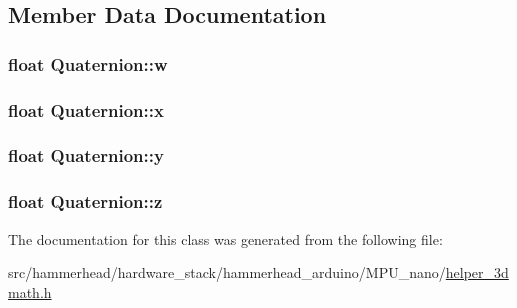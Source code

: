 \subsection{Member Data Documentation}
\subsubsection[{\texorpdfstring{w}{w}}]{\setlength{\rightskip}{0pt plus 5cm}float Quaternion\+::w}\hypertarget{classQuaternion_aa44a65ab99e36f6ab8771030eed8a7ad}{}\label{classQuaternion_aa44a65ab99e36f6ab8771030eed8a7ad}
\subsubsection[{\texorpdfstring{x}{x}}]{\setlength{\rightskip}{0pt plus 5cm}float Quaternion\+::x}\hypertarget{classQuaternion_a8b80f191a3155cc0158d2b4f4d50b2cb}{}\label{classQuaternion_a8b80f191a3155cc0158d2b4f4d50b2cb}
\subsubsection[{\texorpdfstring{y}{y}}]{\setlength{\rightskip}{0pt plus 5cm}float Quaternion\+::y}\hypertarget{classQuaternion_a3bd3f270462944423611f44e19d2511b}{}\label{classQuaternion_a3bd3f270462944423611f44e19d2511b}
\subsubsection[{\texorpdfstring{z}{z}}]{\setlength{\rightskip}{0pt plus 5cm}float Quaternion\+::z}\hypertarget{classQuaternion_a625cb732d8ff3083e7852b86b736ab29}{}\label{classQuaternion_a625cb732d8ff3083e7852b86b736ab29}


The documentation for this class was generated from the following file\+:\begin{DoxyCompactItemize}
\item 
src/hammerhead/hardware\+\_\+stack/hammerhead\+\_\+arduino/\+M\+P\+U\+\_\+nano/\hyperlink{helper__3dmath_8h}{helper\+\_\+3dmath.\+h}\end{DoxyCompactItemize}
